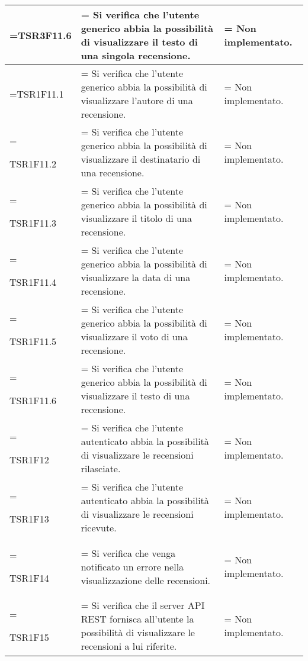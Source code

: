 \begin{xltabular}{\textwidth} {
        >{\hsize\linewidth=\hsize}X
        >{\hsize\linewidth=\hsize}X
        >{\hsize\linewidth=\hsize}X
    }
    TSR3F11.6 &
    Si verifica che l'utente generico abbia la possibilità di visualizzare il testo di una singola recensione.  &
    Non implementato.
    \\ \hline
    
    TSR1F11.1 &
    Si verifica che l'utente generico abbia la possibilità di visualizzare l'autore di una recensione.  &
    Non implementato.
    \\ \hline
    
    TSR1F11.2 &
    Si verifica che l'utente generico abbia la possibilità di visualizzare il destinatario di una recensione.  &
    Non implementato.
    \\ \hline

    TSR1F11.3 &
    Si verifica che l'utente generico abbia la possibilità di visualizzare il titolo di una recensione.  &
    Non implementato.
    \\ \hline

    TSR1F11.4 &
    Si verifica che l'utente generico abbia la possibilità di visualizzare la data di una recensione.  &
    Non implementato.
    \\ \hline

    TSR1F11.5 &
    Si verifica che l'utente generico abbia la possibilità di visualizzare il voto di una recensione.  &
    Non implementato.
    \\ \hline

    TSR1F11.6 &
    Si verifica che l'utente generico abbia la possibilità di visualizzare il testo di una recensione.  &
    Non implementato.
    \\ \hline

    TSR1F12 &
    Si verifica che l'utente autenticato abbia la possibilità di visualizzare le recensioni rilasciate.  &
    Non implementato.
    \\ \hline

    TSR1F13 &
    Si verifica che l'utente autenticato abbia la possibilità di visualizzare le recensioni ricevute.  &
    Non implementato.
    \\ \hline

    TSR1F14 &
    Si verifica che venga notificato un errore nella visualizzazione delle recensioni.  &
    Non implementato.
    \\ \hline

    TSR1F15 &
    Si verifica che il server API REST fornisca all'utente la possibilità di visualizzare le recensioni a lui riferite. &
    Non implementato.
    \\ \hline


\end{xltabular}
